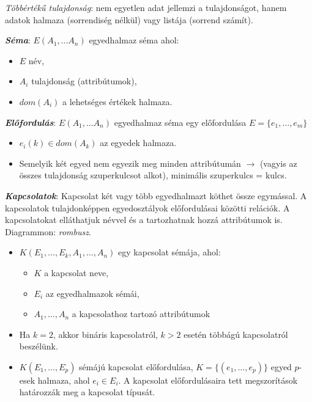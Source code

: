 \documentclass[tikz,12pt,margin=0px]{article}
\begin{document}
    \noindent \emph{Többértékű tulajdonság}: nem egyetlen adat jellemzi a tulajdonságot, hanem adatok halmaza (sorrendiség nélkül) vagy listája (sorrend számít).

    \begin{center}
    \end{center}

	\noindent \textbf{\emph{Séma}}: $E(A_1,...A_n)$ egyedhalmaz séma ahol:
    \begin{itemize}
        \item $E$ név,
        \item $A_i$ tulajdonság (attribútumok),
        \item $dom(A_i)$ a lehetséges értékek halmaza.
    \end{itemize}

    \noindent \textbf{\emph{Előfordulás}}: $E(A_1,...A_n)$ egyedhalmaz séma egy előfordulása $E=\{e_1,\ldots,e_m\}$
    \begin{itemize}
        \item $e_i(k) \in dom(A_k)$ az egyedek halmaza.
        \item Semelyik két egyed nem egyezik meg minden attribútumán $\to$ (vagyis az összes tulajdonság szuperkulcsot alkot), minimális szuperkulcs = kulcs.
    \end{itemize}

    \noindent \textbf{\emph{Kapcsolatok}}: Kapcsolat két vagy több egyedhalmazt köthet össze egymással. A kapcsolatok tulajdonképpen egyedosztályok előfordulásai közötti relációk. A kapcsolatokat elláthatjuk névvel és a tartozhatnak hozzá attribútumok is. Diagrammon: \emph{rombusz}.
    \begin{itemize}
        \item $K(E_1,\ldots, E_{k}, A_1, \ldots, A_n)$ egy kapcsolat sémája, ahol:
        \begin{itemize}
            \item $K$ a kapcsolat neve,
            \item $E_i$ az egyedhalmazok sémái,
            \item $A_1, \ldots, A_n$ a kapcsolathoz tartozó attribútumok
        \end{itemize}
        \item Ha $k=2$, akkor bináris kapcsolatról, $k > 2$ esetén többágú kapcsolatról beszélünk.
        \item $K(E_1, \ldots,E_p)$ sémájú kapcsolat előfordulása, $K=\{(e_1, \ldots, e_p)\}$ egyed $p$-esek halmaza, ahol $e_i \in E_i$. A kapcsolat előfordulásaira tett megszorítások határozzák meg a kapcsolat típusát.
    \end{itemize}
\end{document}
